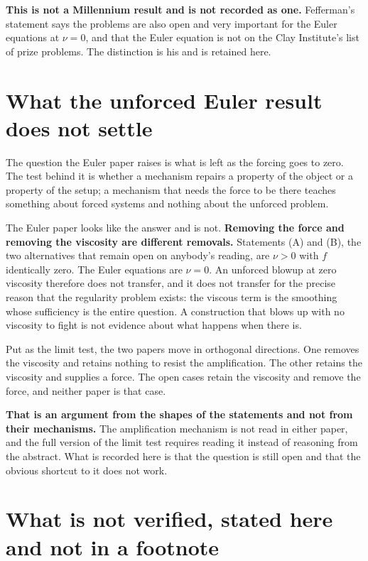 \textbf{This is not a Millennium result and is not recorded as one.} Fefferman's statement says the
problems are also open and very important for the Euler equations at $\nu = 0$, and that the Euler
equation is not on the Clay Institute's list of prize problems. The distinction is his and is retained
here.

\section{What the unforced Euler result does not settle}

The question the Euler paper raises is what is left as the forcing goes to zero. The test behind it
is whether a mechanism repairs a property of the object or a property of the setup; a mechanism that
needs the force to be there teaches something about forced systems and nothing about the unforced
problem.

The Euler paper looks like the answer and is not. \textbf{Removing the force and removing the
viscosity are different removals.} Statements (A) and (B), the two alternatives that remain open on
anybody's reading, are $\nu > 0$ with $f$ identically zero. The Euler equations are $\nu = 0$. An
unforced blowup at zero viscosity therefore does not transfer, and it does not transfer for the precise
reason that the regularity problem exists: the viscous term is the smoothing whose sufficiency is
the entire question. A construction that blows up with no viscosity to fight is not evidence about
what happens when there is.

Put as the limit test, the two papers move in orthogonal directions. One removes the viscosity and
retains nothing to resist the amplification. The other retains the viscosity and supplies a force. The
open cases retain the viscosity and remove the force, and neither paper is that case.

\textbf{That is an argument from the shapes of the statements and not from their mechanisms.} The
amplification mechanism is not read in either paper, and the full version of the limit test
requires reading it instead of reasoning from the abstract. What is recorded here is that the
question is still open and that the obvious shortcut to it does not work.

\section{What is not verified, stated here and not in a footnote}

